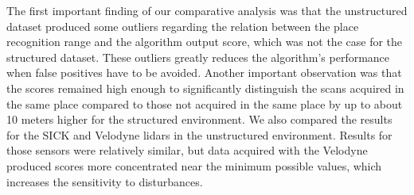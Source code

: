 The first important finding of our comparative analysis was that the unstructured dataset produced some outliers regarding the relation between the place recognition range and the algorithm output score, which was not the case for the structured dataset. These outliers greatly reduces the algorithm's performance when false positives have to be avoided.  Another important observation was that  the scores remained high enough to significantly distinguish the scans acquired in the same place compared to those not acquired in the same place by up to about 10 meters higher for the structured environment. We also compared the results for the SICK and Velodyne \gls*{lidar}s in the unstructured environment. Results for those sensors were relatively similar, but data acquired with the Velodyne  produced scores more concentrated near the minimum possible values, which increases the sensitivity to disturbances.

